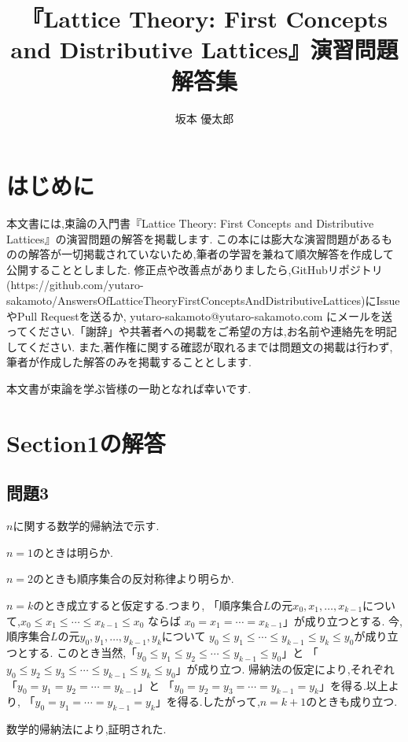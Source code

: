 \documentclass{jsarticle}
\title{『Lattice Theory: First Concepts and Distributive Lattices』演習問題解答集}
\author{坂本 優太郎}
\date{\todayAD}
\begin{document}
\maketitle
\clearpage

\section*{はじめに}
本文書には,束論の入門書『Lattice Theory: First Concepts and Distributive Lattices』の演習問題の解答を掲載します.
この本には膨大な演習問題があるものの解答が一切掲載されていないため,筆者の学習を兼ねて順次解答を作成して公開することとしました.
修正点や改善点がありましたら,GitHubリポジトリ(https://github.com/yutaro-sakamoto/AnswersOfLatticeTheoryFirstConceptsAndDistributiveLattices)にIssueやPull Requestを送るか,
yutaro-sakamoto@yutaro-sakamoto.com にメールを送ってください.「謝辞」や共著者への掲載をご希望の方は,お名前や連絡先を明記してください.
また,著作権に関する確認が取れるまでは問題文の掲載は行わず,筆者が作成した解答のみを掲載することとします.\par
本文書が束論を学ぶ皆様の一助となれば幸いです.
\clearpage

\tableofcontents
\clearpage

\section{Section1の解答}
\subsection{問題3}
$n$に関する数学的帰納法で示す.\par
$n=1$のときは明らか.\par
$n=2$のときも順序集合の反対称律より明らか.\par
$n=k$のとき成立すると仮定する.つまり,
「順序集合$L$の元$x_0, x_1, \dots, x_{k-1}$について,$x_0 \leq x_1 \leq \cdots \leq x_{k-1} \leq x_0$ ならば
$x_0 = x_1 = \cdots = x_{k-1}$」が成り立つとする.
今,順序集合$L$の元$y_0, y_1, \dots, y_{k-1}, y_k$について
$y_0 \leq y_1 \leq \cdots \leq y_{k-1} \leq y_k \leq y_0$が成り立つとする.
このとき当然,「$y_0 \leq y_1 \leq y_2 \leq \cdots \leq y_{k-1} \leq y_0$」と
「$y_0 \leq y_2 \leq y_3 \leq \cdots \leq y_{k-1} \leq y_k \leq y_0$」が成り立つ.
帰納法の仮定により,それぞれ「$y_0 = y_1 = y_2 = \cdots = y_{k-1}$」と
「$y_0 = y_2 = y_3 = \cdots = y_{k-1} = y_k$」を得る.以上より,
「$y_0 = y_1 = \cdots = y_{k-1} = y_k$」を得る.したがって,$n=k+1$のときも成り立つ.\par
数学的帰納法により,証明された.
\end{document}
